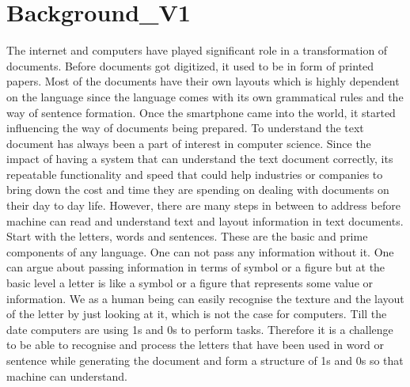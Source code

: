 \chapter{Background\_V1 \label{Chapter_Background}}

\large  The internet and computers have played significant role in a transformation of documents. Before documents got digitized, it used to be in form of printed papers. Most of the documents have their own layouts which is highly dependent on the language since the language comes with its own grammatical rules and the way of sentence formation. Once the smartphone came into the world, it started influencing the way of documents being prepared. To understand the text document has always been a part of interest in computer science. Since the impact of having a system that can understand the text document correctly, its repeatable functionality and speed that could help industries or companies to bring down the cost and time they are spending on dealing with documents on their day to day life. However, there are many steps in between to address before machine can read and understand text and layout information in text documents. Start with the letters, words and sentences. These are the basic and prime components of any language. One can not pass any information without it. One can argue about passing information in terms of symbol or a figure but at the basic level a letter is like a symbol or a figure that represents some value or information. We as a human being can easily recognise the texture and the layout of the letter by just looking at it, which is not the case for computers. Till the date computers are using 1s and 0s to perform tasks. Therefore it is a challenge to be able to recognise and process the letters that have been used in word or sentence while generating the document and form a structure of 1s and 0s so that machine can understand. 

